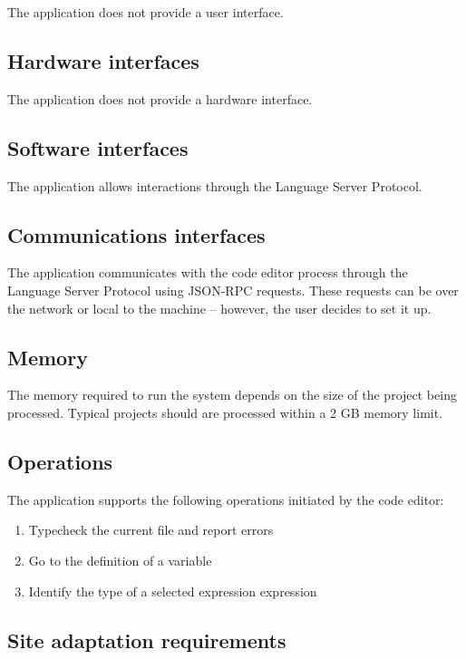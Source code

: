 \documentclass[12pt]{article}
\newcounter{req}
\begin{document}
The application does not provide a user interface.

\subsection{Hardware interfaces}

The application does not provide a hardware interface.

\subsection{Software interfaces}

The application allows interactions through the Language Server Protocol.

\subsection{Communications interfaces}

The application communicates with the code editor process through the Language Server Protocol using JSON-RPC requests. These requests can be over the network or local to the machine – however, the user decides to set it up.

\subsection{Memory}

The memory required to run the system depends on the size of the project being processed. Typical projects should are processed within a 2 GB memory limit.

\subsection{Operations}

The application supports the following operations initiated by the code editor:

\begin{enumerate}
  \item Typecheck the current file and report errors
  \item Go to the definition of a variable
  \item Identify the type of a selected expression expression
\end{enumerate}

\subsection{Site adaptation requirements}
\end{document}
